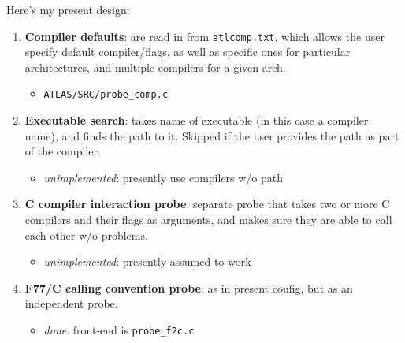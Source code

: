 \documentclass[11pt]{article}
\begin{document}
Here's my present design:
\begin{enumerate}
\item {\bf Compiler defaults}: are read in from {\tt atlcomp.txt}, which
      allows the user specify default compiler/flags, as well as specific
      ones for particular architectures, and multiple compilers for a given
      arch.  
   \begin{itemize}
      \item {\tt ATLAS/SRC/probe\_comp.c}
   \end{itemize}
\item {\bf Executable search}: takes name of executable (in this case
      a compiler name), and finds the path to it.  Skipped if the user
      provides the path as part of the compiler.
   \begin{itemize}
   \item {\it unimplemented}: presently use compilers w/o path
   \end{itemize}
\item {\bf C compiler interaction probe}: separate probe that takes two or
      more C compilers and their flags as arguments, and makes sure they
      are able to call each other w/o problems.
   \begin{itemize}
   \item {\it unimplemented}: presently assumed to work
   \end{itemize}
\item {\bf F77/C calling convention probe}: as in present config, but as
      an independent probe.
   \begin{itemize}
   \item {\it done}: front-end is {\tt probe\_f2c.c}
   \end{itemize}
\end{enumerate}
\end{document}
